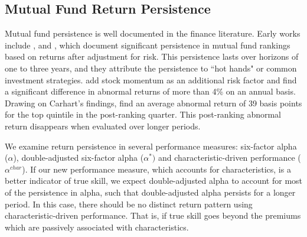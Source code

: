 
\subsection{Mutual Fund Return Persistence}
Mutual fund persistence is well documented in the finance literature. Early works include \citet{grinblatt1992persistence}, \citet{brown1995performance} and \citet{wermers1997momentum}, which document significant persistence in mutual fund rankings based on returns after adjustment for risk. This persistence lasts over horizons of one to three years, and they attribute the persistence to ``hot hands" or common investment strategies. \citet{carhart1997persistence} add stock momentum as an additional risk factor and find a significant difference in abnormal returns of more than 4\% on an annual basis. Drawing on Carhart's findings, \citet{bollen2004short} find an average abnormal return of 39 basis points for the top quintile in the post-ranking quarter. This post-ranking abnormal return disappears when evaluated over longer periods. 

We examine return persistence in several performance measures: six-factor alpha ($\alpha$), double-adjusted six-factor alpha ($\alpha^*)$ and characteristic-driven performance ($\alpha^{char}$). If our new performance measure, which accounts for characteristics, is a better indicator of true skill, we expect double-adjusted alpha to account for most of the persistence in alpha, such that double-adjusted alpha persists for a longer period. In this case, there should be no distinct return pattern using characteristic-driven performance. That is, if true skill goes beyond the premiums which are passively associated with characteristics. 

